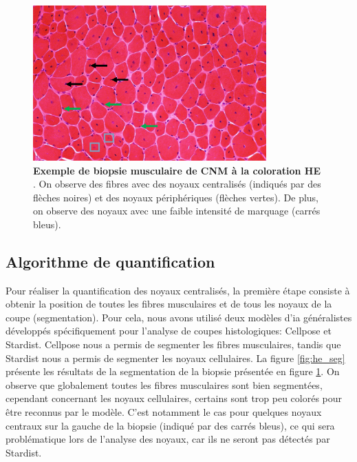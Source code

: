 \begin{figure}[htbp]
 \centering
 \includegraphics[width=0.8\textwidth]{figures/he_example.jpg}
 \caption[Exemple de biopsie musculaire à la coloration HE]{\textbf{Exemple de biopsie musculaire de CNM à la coloration HE }. On observe des fibres avec des noyaux centralisés (indiqués par des flèches noires) et des noyaux périphériques (flèches vertes). De plus, on observe des noyaux avec une faible intensité de marquage (carrés bleus).}
 \label{fig:he_example}
\end{figure}

\subsection{Algorithme de quantification}
Pour réaliser la quantification des noyaux centralisés, la première étape consiste à obtenir la position de toutes les fibres musculaires et de tous les noyaux de la coupe (segmentation). Pour cela, nous avons utilisé deux modèles d'\gls{ia} généralistes développés spécifiquement pour l'analyse de coupes histologiques: Cellpose et Stardist. Cellpose nous a permis de segmenter les fibres musculaires, tandis que Stardist nous a permis de segmenter les noyaux cellulaires. La figure \ref{fig:he_seg} présente les résultats de la segmentation de la biopsie présentée en figure \ref{fig:he_example}. On observe que globalement toutes les fibres musculaires sont bien segmentées, cependant concernant les noyaux cellulaires, certains sont trop peu colorés pour être reconnus par le modèle. C'est notamment le cas pour quelques noyaux centraux sur la gauche de la biopsie (indiqué par des carrés bleus), ce qui sera problématique lors de l'analyse des noyaux, car ils ne seront pas détectés par Stardist.


